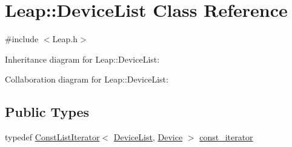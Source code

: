 \hypertarget{class_leap_1_1_device_list}{}\section{Leap\+:\+:Device\+List Class Reference}
\label{class_leap_1_1_device_list}


{\ttfamily \#include $<$Leap.\+h$>$}



Inheritance diagram for Leap\+:\+:Device\+List\+:


Collaboration diagram for Leap\+:\+:Device\+List\+:
\subsection*{Public Types}
\begin{DoxyCompactItemize}
\item 
typedef \hyperlink{class_leap_1_1_const_list_iterator}{Const\+List\+Iterator}$<$ \hyperlink{class_leap_1_1_device_list}{Device\+List}, \hyperlink{class_leap_1_1_device}{Device} $>$ \hyperlink{class_leap_1_1_device_list_acfe5b07cda502759bf8fe768e8c6ba87}{const\+\_\+iterator}
\end{DoxyCompactItemize}
